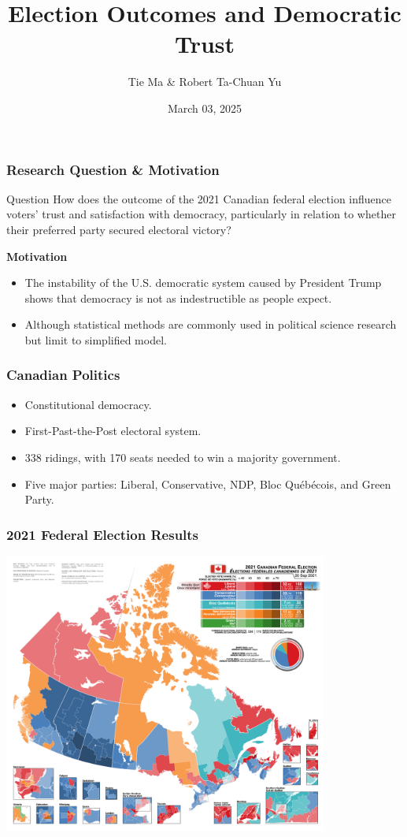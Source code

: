 \documentclass{beamer}
\title{Election Outcomes and Democratic Trust}
\author{Tie Ma \& Robert Ta-Chuan Yu}
\date{March 03, 2025}
\begin{document}
\maketitle

\begin{frame}
\frametitle{Research Question \& Motivation}
\vspace{-1.5cm}
\begin{block}
{Question} How does the outcome of the 2021 Canadian federal election influence voters' trust and satisfaction with democracy, particularly in relation to whether their preferred party secured electoral victory?
\end{block}
\bigskip{}

\textbf{Motivation}
\begin{itemize}
    \item The instability of the U.S. democratic system caused by President Trump shows that democracy is not as indestructible as people expect.
    \item Although statistical methods are commonly used in political science research but limit to simplified model. 
\end{itemize}
\end{frame}

\begin{frame}
    \frametitle{Canadian Politics}
    \begin{itemize}
        \item Constitutional democracy.
        \item First-Past-the-Post electoral system.
        \item 338 ridings, with 170 seats needed to win a majority government.
        \item Five major parties: Liberal, Conservative, NDP, Bloc Québécois, and Green Party.
    \end{itemize}
\end{frame}



\begin{frame}
    \frametitle{2021 Federal Election Results}
    \centering
    \includegraphics[width=0.8\textwidth]{Canada_Election_2021_Results_Map.pdf} %
\end{frame}
\end{document}
